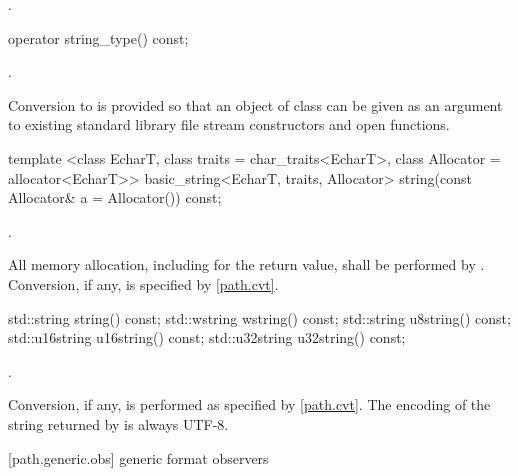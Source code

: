 \begin{itemdescr}
\pnum
\returns {}.
\end{itemdescr}

\begin{itemdecl}
operator string_type() const;
\end{itemdecl}

\begin{itemdescr}
\pnum
\returns {}.

\pnum
\enternote Conversion to  is provided so that an
  object of class  can be given as an argument to existing
  standard library file stream constructors and open functions. \exitnote
\end{itemdescr}

\begin{itemdecl}
template <class EcharT, class traits = char_traits<EcharT>,
          class Allocator = allocator<EcharT>>
  basic_string<EcharT, traits, Allocator>
    string(const Allocator& a = Allocator()) const;
\end{itemdecl}

\begin{itemdescr}
\pnum
\returns {}.

\pnum
\remarks All memory allocation, including for the return value, shall
be performed by . Conversion, if any, is specified by
\ref{path.cvt}.
\end{itemdescr}

\begin{itemdecl}
std::string string() const;
std::wstring wstring() const;
std::string u8string() const;
std::u16string u16string() const;
std::u32string u32string() const;
\end{itemdecl}

\begin{itemdescr}
\pnum
\returns {}.

\pnum
\remarks Conversion, if any, is performed as specified
by \ref{path.cvt}.
The encoding of the string returned by  is always UTF-8.
\end{itemdescr}


[path.generic.obs]{ generic format observers}

